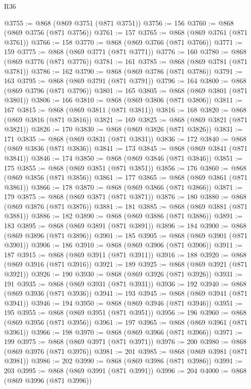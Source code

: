 \begin{lexlean}{R36}
\begin{coremodule}
@3755 := @868 (@869 @3751 (@871 @3751))
@3756 := 156
@3760 := @868 (@869 @3756 (@871 @3756))
@3761 := 157
@3765 := @868 (@869 @3761 (@871 @3761))
@3766 := 158
@3770 := @868 (@869 @3766 (@871 @3766))
@3771 := 159
@3775 := @868 (@869 @3771 (@871 @3771))
@3776 := 160
@3780 := @868 (@869 @3776 (@871 @3776))
@3781 := 161
@3785 := @868 (@869 @3781 (@871 @3781))
@3786 := 162
@3790 := @868 (@869 @3786 (@871 @3786))
@3791 := 163
@3795 := @868 (@869 @3791 (@871 @3791))
@3796 := 164
@3800 := @868 (@869 @3796 (@871 @3796))
@3801 := 165
@3805 := @868 (@869 @3801 (@871 @3801))
@3806 := 166
@3810 := @868 (@869 @3806 (@871 @3806))
@3811 := 167
@3815 := @868 (@869 @3811 (@871 @3811))
@3816 := 168
@3820 := @868 (@869 @3816 (@871 @3816))
@3821 := 169
@3825 := @868 (@869 @3821 (@871 @3821))
@3826 := 170
@3830 := @868 (@869 @3826 (@871 @3826))
@3831 := 171
@3835 := @868 (@869 @3831 (@871 @3831))
@3836 := 172
@3840 := @868 (@869 @3836 (@871 @3836))
@3841 := 173
@3845 := @868 (@869 @3841 (@871 @3841))
@3846 := 174
@3850 := @868 (@869 @3846 (@871 @3846))
@3851 := 175
@3855 := @868 (@869 @3851 (@871 @3851))
@3856 := 176
@3860 := @868 (@869 @3856 (@871 @3856))
@3861 := 177
@3865 := @868 (@869 @3861 (@871 @3861))
@3866 := 178
@3870 := @868 (@869 @3866 (@871 @3866))
@3871 := 179
@3875 := @868 (@869 @3871 (@871 @3871))
@3876 := 180
@3880 := @868 (@869 @3876 (@871 @3876))
@3881 := 181
@3885 := @868 (@869 @3881 (@871 @3881))
@3886 := 182
@3890 := @868 (@869 @3886 (@871 @3886))
@3891 := 183
@3895 := @868 (@869 @3891 (@871 @3891))
@3896 := 184
@3900 := @868 (@869 @3896 (@871 @3896))
@3901 := 185
@3905 := @868 (@869 @3901 (@871 @3901))
@3906 := 186
@3910 := @868 (@869 @3906 (@871 @3906))
@3911 := 187
@3915 := @868 (@869 @3911 (@871 @3911))
@3916 := 188
@3920 := @868 (@869 @3916 (@871 @3916))
@3921 := 189
@3925 := @868 (@869 @3921 (@871 @3921))
@3926 := 190
@3930 := @868 (@869 @3926 (@871 @3926))
@3931 := 191
@3935 := @868 (@869 @3931 (@871 @3931))
@3936 := 192
@3940 := @868 (@869 @3936 (@871 @3936))
@3941 := 193
@3945 := @868 (@869 @3941 (@871 @3941))
@3946 := 194
@3950 := @868 (@869 @3946 (@871 @3946))
@3951 := 195
@3955 := @868 (@869 @3951 (@871 @3951))
@3956 := 196
@3960 := @868 (@869 @3956 (@871 @3956))
@3961 := 197
@3965 := @868 (@869 @3961 (@871 @3961))
@3966 := 198
@3970 := @868 (@869 @3966 (@871 @3966))
@3971 := 199
@3975 := @868 (@869 @3971 (@871 @3971))
@3976 := 200
@3980 := @868 (@869 @3976 (@871 @3976))
@3981 := 201
@3985 := @868 (@869 @3981 (@871 @3981))
@3986 := 202
@3990 := @868 (@869 @3986 (@871 @3986))
@3991 := 203
@3995 := @868 (@869 @3991 (@871 @3991))
@3996 := 204
@4000 := @868 (@869 @3996 (@871 @3996))

\end{coremodule}
\end{lexlean}

